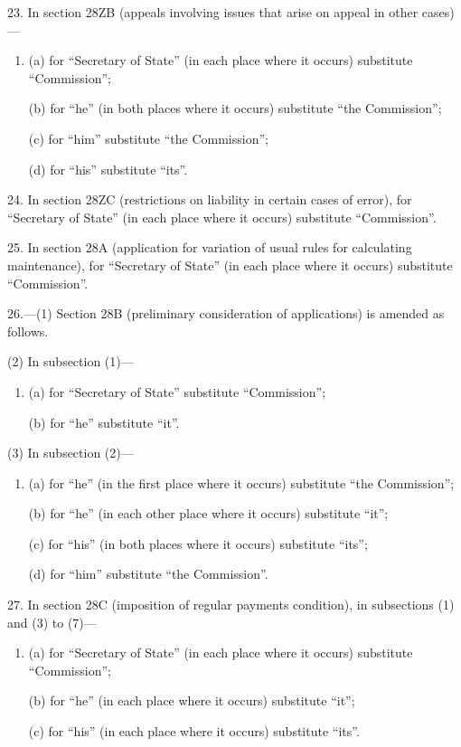 \documentclass[a4paper]{article}
\begin{document}
\medskip

23. In section 28ZB (appeals involving issues that arise on appeal in other cases)—
\begin{enumerate}\item[]
(a) for “Secretary of State” (in each place where it occurs) substitute “Commission”;

(b) for “he” (in both places where it occurs) substitute “the Commission”;

(c) for “him” substitute “the Commission”;

(d) for “his” substitute “its”.
\end{enumerate}

\medskip

24. In section 28ZC (restrictions on liability in certain cases of error), for “Secretary of State” (in each place where it occurs) substitute “Commission”.

\medskip

25. In section 28A (application for variation of usual rules for calculating maintenance), for “Secretary of State” (in each place where it occurs) substitute “Commission”.

\medskip

26.---(1) Section 28B (preliminary consideration of applications) is amended as follows.

(2) In subsection (1)—
\begin{enumerate}\item[]
(a) for “Secretary of State” substitute “Commission”;

(b) for “he” substitute “it”.
\end{enumerate}

(3) In subsection (2)—
\begin{enumerate}\item[]
(a) for “he” (in the first place where it occurs) substitute “the Commission”;

(b) for “he” (in each other place where it occurs) substitute “it”;

(c) for “his” (in both places where it occurs) substitute “its”;

(d) for “him” substitute “the Commission”.
\end{enumerate}

\medskip

27. In section 28C (imposition of regular payments condition), in subsections (1) and (3) to (7)—
\begin{enumerate}\item[]
(a) for “Secretary of State” (in each place where it occurs) substitute “Commission”;

(b) for “he” (in each place where it occurs) substitute “it”;

(c) for “his” (in each place where it occurs) substitute “its”.
\end{enumerate}
\end{document}

